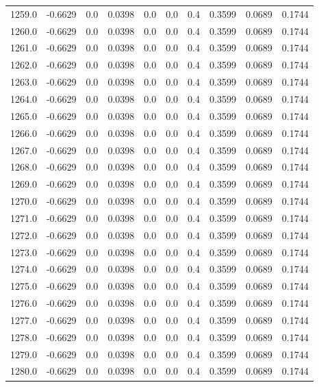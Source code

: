 \begin{longtable}{lrrrrrrrrr}
1259.0 & -0.6629 & 0.0 & 0.0398 & 0.0 & 0.0 & 0.4 & 0.3599 & 0.0689 & 0.1744 \\
1260.0 & -0.6629 & 0.0 & 0.0398 & 0.0 & 0.0 & 0.4 & 0.3599 & 0.0689 & 0.1744 \\
1261.0 & -0.6629 & 0.0 & 0.0398 & 0.0 & 0.0 & 0.4 & 0.3599 & 0.0689 & 0.1744 \\
1262.0 & -0.6629 & 0.0 & 0.0398 & 0.0 & 0.0 & 0.4 & 0.3599 & 0.0689 & 0.1744 \\
1263.0 & -0.6629 & 0.0 & 0.0398 & 0.0 & 0.0 & 0.4 & 0.3599 & 0.0689 & 0.1744 \\
1264.0 & -0.6629 & 0.0 & 0.0398 & 0.0 & 0.0 & 0.4 & 0.3599 & 0.0689 & 0.1744 \\
1265.0 & -0.6629 & 0.0 & 0.0398 & 0.0 & 0.0 & 0.4 & 0.3599 & 0.0689 & 0.1744 \\
1266.0 & -0.6629 & 0.0 & 0.0398 & 0.0 & 0.0 & 0.4 & 0.3599 & 0.0689 & 0.1744 \\
1267.0 & -0.6629 & 0.0 & 0.0398 & 0.0 & 0.0 & 0.4 & 0.3599 & 0.0689 & 0.1744 \\
1268.0 & -0.6629 & 0.0 & 0.0398 & 0.0 & 0.0 & 0.4 & 0.3599 & 0.0689 & 0.1744 \\
1269.0 & -0.6629 & 0.0 & 0.0398 & 0.0 & 0.0 & 0.4 & 0.3599 & 0.0689 & 0.1744 \\
1270.0 & -0.6629 & 0.0 & 0.0398 & 0.0 & 0.0 & 0.4 & 0.3599 & 0.0689 & 0.1744 \\
1271.0 & -0.6629 & 0.0 & 0.0398 & 0.0 & 0.0 & 0.4 & 0.3599 & 0.0689 & 0.1744 \\
1272.0 & -0.6629 & 0.0 & 0.0398 & 0.0 & 0.0 & 0.4 & 0.3599 & 0.0689 & 0.1744 \\
1273.0 & -0.6629 & 0.0 & 0.0398 & 0.0 & 0.0 & 0.4 & 0.3599 & 0.0689 & 0.1744 \\
1274.0 & -0.6629 & 0.0 & 0.0398 & 0.0 & 0.0 & 0.4 & 0.3599 & 0.0689 & 0.1744 \\
1275.0 & -0.6629 & 0.0 & 0.0398 & 0.0 & 0.0 & 0.4 & 0.3599 & 0.0689 & 0.1744 \\
1276.0 & -0.6629 & 0.0 & 0.0398 & 0.0 & 0.0 & 0.4 & 0.3599 & 0.0689 & 0.1744 \\
1277.0 & -0.6629 & 0.0 & 0.0398 & 0.0 & 0.0 & 0.4 & 0.3599 & 0.0689 & 0.1744 \\
1278.0 & -0.6629 & 0.0 & 0.0398 & 0.0 & 0.0 & 0.4 & 0.3599 & 0.0689 & 0.1744 \\
1279.0 & -0.6629 & 0.0 & 0.0398 & 0.0 & 0.0 & 0.4 & 0.3599 & 0.0689 & 0.1744 \\
1280.0 & -0.6629 & 0.0 & 0.0398 & 0.0 & 0.0 & 0.4 & 0.3599 & 0.0689 & 0.1744 \\

\end{longtable}
